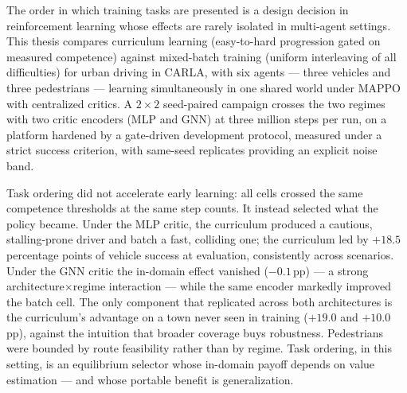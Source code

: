 \documentclass[12pt,a4paper,oneside]{report}
\begin{document}
\clearpage
\null\vfil
\begin{center}%
  \bfseries \abstractname
\end{center}
The order in which training tasks are presented is a design decision in
reinforcement learning whose effects are rarely isolated in multi-agent
settings. This thesis compares curriculum learning (easy-to-hard
progression gated on measured competence) against mixed-batch training
(uniform interleaving of all difficulties) for urban driving in CARLA,
with six agents --- three vehicles and three pedestrians --- learning
simultaneously in one shared world under MAPPO with centralized critics.
A $2\times2$ seed-paired campaign crosses the two regimes with two
critic encoders (MLP and GNN) at three million steps per run, on a
platform hardened by a gate-driven development protocol, measured under
a strict success criterion, with same-seed replicates providing an
explicit noise band.

Task ordering did not accelerate early learning: all cells crossed the
same competence thresholds at the same step counts. It instead selected
what the policy became. Under the MLP critic, the curriculum produced a
cautious, stalling-prone driver and batch a fast, colliding one; the
curriculum led by $+18.5$ percentage points of vehicle success at
evaluation, consistently across scenarios. Under the GNN critic the
in-domain effect vanished ($-0.1$\,pp) --- a strong
architecture$\times$regime interaction --- while the same encoder
markedly improved the batch cell. The only component that replicated
across both architectures is the curriculum's advantage on a town never
seen in training ($+19.0$ and $+10.0$\,pp), against the intuition that
broader coverage buys robustness. Pedestrians were bounded by route
feasibility rather than by regime. Task ordering, in this setting, is an
equilibrium selector whose in-domain payoff depends on value estimation
--- and whose portable benefit is generalization.
\par\vfil\null

\tableofcontents

\end{document}
